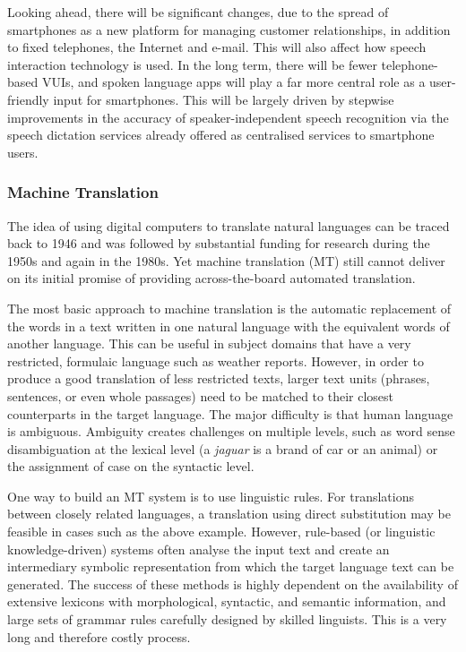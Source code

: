 \documentclass[]{../../metanetpaper}
\begin{document}
\begin{multicols}{2}
Looking ahead, there will be significant changes, due to the spread of smartphones as a new platform for managing customer relationships, in addition to fixed telephones, the Internet and e-mail. This will also affect how speech interaction technology is used. In the long term, there will be fewer telephone-based VUIs, and spoken language apps will play a far more central role as a user-friendly input for smartphones. This will be largely driven by stepwise improvements in the accuracy of speaker-independent speech recognition via the speech dictation services already offered as centralised services to smartphone users.

\subsubsection{Machine Translation}

The idea of using digital computers to translate natural languages can be traced back to 1946 and was followed by substantial funding for research during the 1950s and again in the 1980s. 
Yet machine translation (MT) still cannot deliver on its initial promise of providing across-the-board automated translation.  


The most basic approach to machine translation is the automatic replacement of the words in a text written in one natural language with the equivalent words of another language. This can be useful in subject domains that have a very restricted, formulaic language such as weather reports. However, in order to produce a good translation of less restricted texts, larger text units (phrases, sentences, or even whole passages) need to be matched to their closest counterparts in the target language. The major difficulty is that human language is ambiguous. Ambiguity creates challenges on multiple levels, such as word sense disambiguation at the lexical level (a \textit{jaguar} is a brand of car or an animal) or the assignment of case on the syntactic level.

One way to build an MT system is to use linguistic rules. For translations between closely related languages, a translation using direct substitution may be feasible in cases such as the above example. However, rule-based (or linguistic knowledge-driven) systems often analyse the input text and create an intermediary symbolic representation from which the target language text can be generated. The success of these methods is highly dependent on the availability of extensive lexicons with morphological, syntactic, and semantic information, and large sets of grammar rules carefully designed by skilled linguists. This is a very long and therefore costly process.


\end{multicols}
\end{document}

